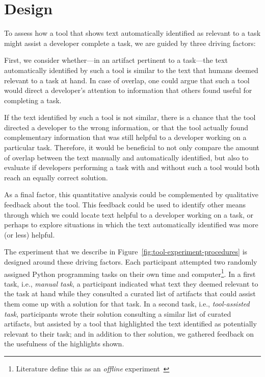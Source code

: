 
\section{Design}
\label{cp6:design}



To assess how a tool that shows text automatically identified as relevant to a task
might assist a developer complete a task, we are guided by three driving factors:


First, we consider whether---in an artifact pertinent to a task---the  text automatically identified by such a tool is similar to the text that humans deemed relevant to a task at hand. 
In case of overlap, one could argue that such a tool  
would direct a developer's attention to information that others found useful for completing a task.


If the text identified by such a tool is not similar, there is a chance that the tool directed a developer to the wrong information, or that 
the tool actually found complementary information that was still helpful to a developer working on a particular task. 
Therefore, it would be beneficial to not only compare the amount of overlap between the text manually
and automatically identified, but also to evaluate if developers performing a task with and without such a tool would 
both reach an equally correct solution.


As a final factor, this quantitative analysis could be complemented by qualitative feedback about the tool. 
This feedback could be used to identify other means through which we could locate 
text helpful to a developer working on a task, or perhaps to explore
situations in which the text automatically identified 
was more (or less) helpful.



The experiment that we describe in Figure~\ref{fig:tool-experiment-procedures} is designed around these driving factors.  
Each participant attempted two randomly assigned Python programming tasks on their own time and computer\footnote{Literature define this as an \textit{offline} experiment~\cite{wohlin2012, DeLucia2012}}.
In a first task, i.e., \textit{manual task}, a participant indicated 
what text they deemed relevant to the task at hand while 
they consulted a curated list of artifacts that could assist them come up with a solution for that task.
In a second task, i.e., \textit{tool-assisted task},
participants wrote their solution consulting a similar list of curated artifacts, but
assisted by a tool that highlighted the text identified as potentially relevant to their task; and in addition to ther solution, we gathered feedback on the usefulness of the highlights shown.

